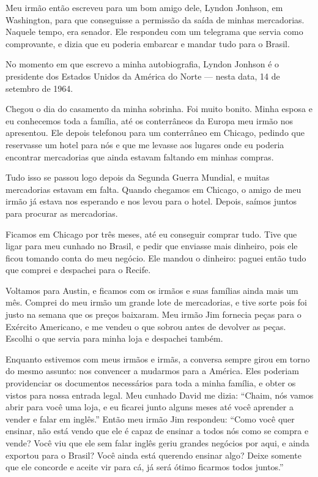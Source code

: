 Meu irmão então escreveu para um bom amigo dele, Lyndon Jonhson,
em Washington, para que conseguisse a
permissão da saída de minhas mercadorias. Naquele tempo, era senador. Ele
respondeu com um telegrama que servia como comprovante, e dizia que eu poderia
embarcar e mandar tudo para o Brasil.

No momento em que escrevo a minha autobiografia, Lyndon
Jonhson é o presidente dos Estados Unidos da América do Norte --- nesta
data, 14 de setembro de 1964.

Chegou o dia do casamento da minha sobrinha. Foi muito bonito. Minha
esposa e eu conhecemos toda a família, até os conterrâneos da Europa
meu irmão nos apresentou. Ele depois telefonou para um conterrâneo
em Chicago, pedindo que reservasse um hotel para nós e que me levasse
aos lugares onde eu poderia encontrar mercadorias que ainda estavam
faltando em minhas compras. 

Tudo isso se passou logo depois da Segunda Guerra Mundial, e muitas mercadorias estavam em falta. Quando chegamos em Chicago, o amigo de meu irmão já estava nos esperando e nos
levou para o hotel. Depois, saímos juntos para procurar as mercadorias.

Ficamos em Chicago por três meses, até eu conseguir comprar tudo. Tive que
ligar para meu cunhado no Brasil, e pedir que enviasse mais dinheiro, pois ele ficou tomando conta do meu negócio. Ele mandou o dinheiro: 
paguei então tudo que comprei e despachei para o Recife.

Voltamos para Austin, e ficamos com os irmãos e suas famílias ainda mais
um mês. Comprei do meu irmão um grande lote de mercadorias, e tive
sorte pois foi justo na semana que os preços baixaram. Meu irmão Jim
fornecia peças para o Exército Americano, e me vendeu o que sobrou
antes de devolver as peças. Escolhi o que servia para minha loja e
despachei também.

Enquanto estivemos com meus irmãos e irmãs, a conversa sempre
girou em torno do mesmo assunto: nos convencer a mudarmos para a
América. Eles poderiam providenciar os documentos necessários para toda a 
minha família, e obter os vistos para nossa entrada legal. Meu cunhado
David me dizia: ``Chaim, nós vamos abrir para você uma loja, e eu ficarei
junto alguns meses até você aprender a vender e falar em inglês.'' Então
meu irmão Jim respondeu: ``Como você quer ensinar, não está vendo que
ele é capaz de ensinar a todos nós como se compra e vende? Você viu que
ele sem falar inglês geriu grandes negócios por aqui, e ainda
exportou para o Brasil? Você ainda está querendo ensinar algo?
Deixe somente que ele concorde e aceite vir para cá, já será ótimo
ficarmos todos juntos.''

